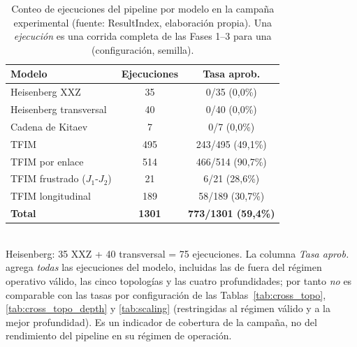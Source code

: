 \begin{table}[htbp]
\centering
\caption[Conteo de ejecuciones por modelo]{Conteo de ejecuciones del pipeline por modelo en la campaña experimental (fuente: ResultIndex, elaboración propia). Una \emph{ejecución} es una corrida completa de las Fases 1--3 para una (configuración, semilla).}
\label{tab:auto_campaign}
\begin{tabular}{lcc}
\toprule
Modelo & Ejecuciones & Tasa aprob. \\
\midrule
Heisenberg XXZ & 35 & 0/35 (0,0\%) \\
Heisenberg transversal & 40 & 0/40 (0,0\%) \\
Cadena de Kitaev & 7 & 0/7 (0,0\%) \\
TFIM & 495 & 243/495 (49,1\%) \\
TFIM por enlace & 514 & 466/514 (90,7\%) \\
TFIM frustrado ($J_1$-$J_2$) & 21 & 6/21 (28,6\%) \\
TFIM longitudinal & 189 & 58/189 (30,7\%) \\
\textbf{Total} & \textbf{1301} & \textbf{773/1301 (59,4\%)} \\
\bottomrule
\end{tabular}
\\[2pt]
\footnotesize Heisenberg: 35 XXZ + 40 transversal = 75 ejecuciones. La columna \emph{Tasa aprob.} agrega \emph{todas} las ejecuciones del modelo, incluidas las de fuera del régimen operativo válido, las cinco topologías y las cuatro profundidades; por tanto \emph{no} es comparable con las tasas por configuración de las Tablas~\ref{tab:cross_topo}, \ref{tab:cross_topo_depth} y \ref{tab:scaling} (restringidas al régimen válido y a la mejor profundidad). Es un indicador de cobertura de la campaña, no del rendimiento del pipeline en su régimen de operación.
\end{table}
